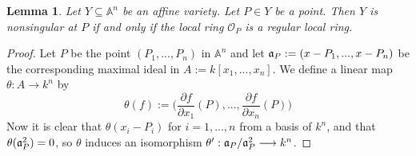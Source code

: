 \documentclass[12pt]{article}
\theoremstyle{plain}
\newtheorem{lemma}[thm]{Lemma}
\theoremstyle{definition}
\newcommand{\bb}[1]{\mathbb{#1}}
\newcommand{\call}[1]{\mathcal{#1}}
\newcommand{\lto}{\longrightarrow}
\begin{document}
\begin{lemma}\label{lem:equivalence_singularity}
Let $Y \subseteq \bb{A}^n$ be an affine variety. Let $P \in Y$ be a point. Then $Y$ is nonsingular at $P$ if and only if the local ring $\call{O}_P$ is a regular local ring.
\end{lemma}
\begin{proof}
Let $P$ be the point $(P_1,...,P_n)$ in $\bb{A}^n$ and let $\frak{a}_P := (x - P_1,...,x - P_n)$ be the corresponding maximal ideal in $A := k[x_1,...,x_n]$. We define a linear map $\theta: A \lto k^n$ by
\begin{equation}
\theta (f) := \Big(\frac{\partial f}{\partial x_1}(P),...,\frac{\partial f}{\partial x_n}(P)\Big)
\end{equation}
Now it is clear that $\theta(x_i - P_i)$ for $i = 1,...,n$ from a basis of $k^n$, and that $\theta(\frak{a}_P^2) = 0$, so $\theta$ induces an isomorphism $\theta': \frak{a}_P/\frak{a}_P^2 \lto k^n$.


\end{proof}
\end{document}
